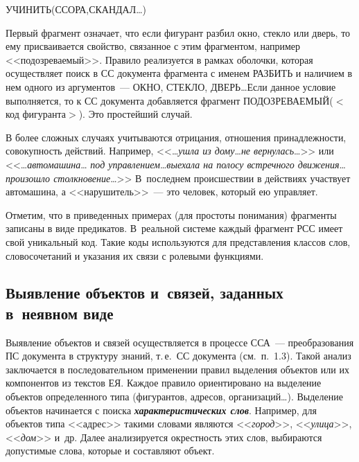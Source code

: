 \begin{multicols}{2}
{\noindent
УЧИНИТЬ(ССОРА,СКАНДАЛ\ldots)

}

\smallskip
     
Первый фрагмент означает, что если фигурант разбил окно, стекло или дверь, 
то ему присваивается свойство, связанное с этим фрагментом, например 
<<подозреваемый>>. Правило реализуется в рамках оболочки, которая 
осуществляет поиск в СС документа фрагмента с именем РАЗБИТЬ и наличием 
в нем одного из аргументов~--- ОКНО, СТЕКЛО, ДВЕРЬ\ldots Если данное 
условие выполняется, то к СС документа добавляется фрагмент 
ПОДОЗРЕВАЕМЫЙ($<$код фигуранта$>$). Это прос\-тей\-ший случай. 
     
     В более сложных случаях учитываются отрица\-ния, отношения 
принадлежности, совокупность действий. Например, <<\ldots\textit{ушла из 
дому}\ldots \textit{не вернулась}\ldots>> или <<\ldots\textit{автомашина}\ldots 
\textit{под управ\-ле\-ни\-ем}\ldots \textit{выехала на полосу встречного 
движения}\ldots \textit{произошло столкновение}\ldots>> В~последнем 
происшествии в действиях участвует автомашина, а <<нарушитель>>~--- это 
человек, который ею управляет. 
{

}
     
     Отметим, что в приведенных примерах (для прос\-то\-ты понимания) 
фрагменты записаны в виде предикатов. В~реальной системе каждый фрагмент 
РСС имеет свой уникальный код. Такие коды используются для представления 
классов слов, словосочетаний и указания их связи с ролевыми функциями. 

\vspace*{-6pt}

\subsection{Выявление объектов и~связей, заданных в~неявном виде} 
     
     Выявление объектов и связей осуществляется в процессе 
ССА~--- преобразования ПС 
документа в структуру знаний, т.\,е.\ СС документа (см.\ п.~1.3). Такой анализ 
заключается в последовательном применении правил выделения объектов или 
их компонентов из текстов ЕЯ. Каждое правило ориентировано на выделение 
объектов определенного типа (фигурантов, адресов, организаций\ldots). 
Выделение объектов начинается с поиска {\bfseries\textit{характеристических 
слов}}. Например, для объектов типа <<адрес>> такими словами являются 
<<\textit{город}>>, <<\textit{улица}>>, <<\textit{дом}>> и~др. Далее 
анализируется окрестность этих слов, выбираются допустимые слова, которые 
и составляют объект. 
     

\end{multicols}

